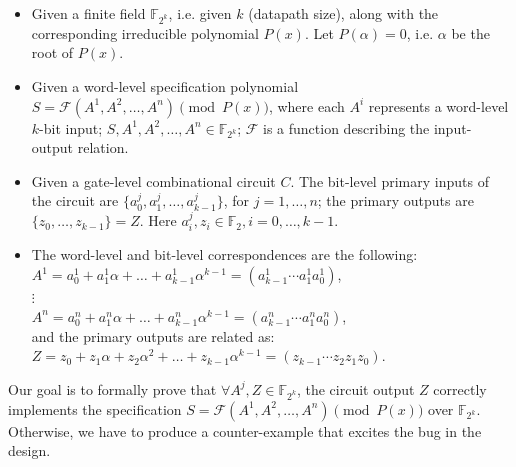 \begin{itemize}
\item Given a finite field $\mathbb{F}_{2^k}$, i.e. given $k$
  (datapath size), along with the   corresponding irreducible
  polynomial $P(x)$. Let $P(\alpha) = 0$, i.e. $\alpha$ be the root of
  $P(x)$.   

\item Given a word-level specification polynomial $S =
  \mathcal{F}(A^{1},A^{2},\dots,A^{n}) \pmod{P(x)}$,  where each
  $A^{i}$ represents a word-level $k$-bit input; $S,
  A^{1},A^{2},\dots,A^{n} \in \mathbb{F}_{2^k}$;   $\mathcal{F}$ is a
  function describing the input-output relation.  

\item  Given a gate-level combinational circuit $C$. The bit-level
  primary inputs of the circuit are
  $\{a_{0}^{j},a_{1}^{j},\dots,a_{k-1}^{j}\}$, for $j=1,\dots, n$;
  the primary outputs are $\{z_0, \dots, z_{k-1}\} = Z$. Here $a_{i}^{j},
  z_i \in \mathbb{F}_2, i = 0, \dots, k-1$.  

\item   The word-level and bit-level correspondences are the following: \\
	$A^{1} = a_0^{1} + a_1^{1}\alpha + \dots +
        a_{k-1}^{1}\alpha^{k-1}=( a_{k-1}^{1}\cdots
        a_{1}^{1}a_{0}^{1})$,\\ 
	  $\vdots$ \\
      $A^{n} = a_0^{n} + a_1^{n}\alpha + \dots +
      a_{k-1}^{n}\alpha^{k-1}=( a_{k-1}^{n}\cdots
      a_{1}^{n}a_{0}^{n})$,\\ 
    and the primary outputs are related as:\\
     $Z = z_0 + z_1\alpha + z_2 \alpha^2 +\dots +
     z_{k-1}\alpha^{k-1}=( z_{k-1}\cdots z_{2}z_{1}z_{0})$.    
\end{itemize}
Our goal is to formally prove that $\forall A^{j}, Z \in
\mathbb{F}_{2^k}$, the circuit output $Z$ correctly implements the
specification $S = \mathcal{F}(A^{1},A^{2},\dots,A^{n}) \pmod{P(x)}$ 
 over $\mathbb{F}_{2^k}$. Otherwise, we have to produce a
 counter-example that excites the bug in the design.  

